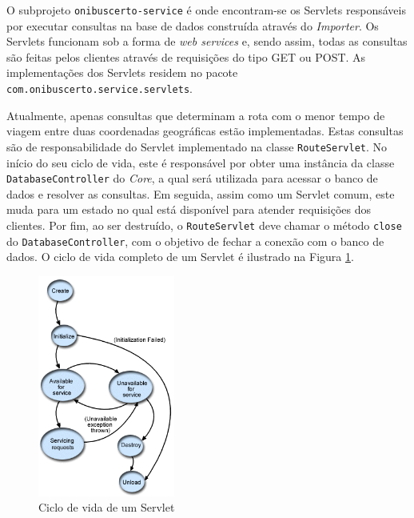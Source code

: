 O subprojeto \texttt{onibuscerto-service} é onde encontram-se os Servlets responsáveis por executar consultas na base de dados construída através do \emph{Importer}.
Os Servlets funcionam sob a forma de \emph{web services} e, sendo assim, todas as consultas são feitas pelos clientes através de requisições  do tipo GET ou POST.
As implementações dos Servlets residem no pacote \texttt{com.onibuscerto.service.servlets}.

Atualmente, apenas consultas que determinam a rota com o menor tempo de viagem entre duas coordenadas geográficas estão implementadas.
Estas consultas são de responsabilidade do Servlet implementado na classe \texttt{RouteServlet}.
No início do seu ciclo de vida, este é responsável por obter uma instância da classe \texttt{DatabaseController} do \emph{Core}, a qual será utilizada para acessar o banco de dados e resolver as consultas.
Em seguida, assim como um Servlet comum, este muda para um estado no qual está disponível para atender requisições dos clientes.
Por fim, ao ser destruído, o \texttt{RouteServlet} deve chamar o método \texttt{close} do \texttt{DatabaseController}, com o objetivo de fechar a conexão com o banco de dados.
O ciclo de vida completo de um Servlet é ilustrado na Figura \ref{fig:servletciclo}.

\begin{figure}[!htb]
	\centering
	\includegraphics[width=0.4\textwidth]{./imgs/servletciclo.png}
	\caption[Ciclo de vida de um Servlet]{Ciclo de vida de um Servlet}
	\label{fig:servletciclo}
\end{figure}

